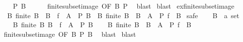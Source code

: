 \begin{isabellebody}
\ \ \isamarkupfalse%
\ {\isachardoublequoteopen}P\ B{\isachardoublequoteclose}\isanewline
\ \ \ \ \isamarkupfalse%
\ finite{\isacharunderscore}{\kern0pt}subset{\isacharunderscore}{\kern0pt}image\ {\isacharbrackleft}{\kern0pt}OF\ B{\isacharbrackright}{\kern0pt}\ P\ \isamarkupfalse%
\ blast\isanewline
{}\isamarkupfalse%
\ blast%
\endisatagproof
{\isafoldproof}%
%
\isadelimproof
\isanewline
%
\endisadelimproof
\isanewline
{}\isamarkupfalse%
\ ex{\isacharunderscore}{\kern0pt}finite{\isacharunderscore}{\kern0pt}subset{\isacharunderscore}{\kern0pt}image{\isacharcolon}{\kern0pt}\isanewline
\ \ {\isachardoublequoteopen}{\isacharparenleft}{\kern0pt}{\isasymexists}B{\isachardot}{\kern0pt}\ finite\ B\ {\isasymand}\ B\ {\isasymsubseteq}\ f\ {\isacharbackquote}{\kern0pt}\ A\ {\isasymand}\ P\ B{\isacharparenright}{\kern0pt}\ {\isasymlongleftrightarrow}\ {\isacharparenleft}{\kern0pt}{\isasymexists}B{\isachardot}{\kern0pt}\ finite\ B\ {\isasymand}\ B\ {\isasymsubseteq}\ A\ {\isasymand}\ P\ {\isacharparenleft}{\kern0pt}f\ {\isacharbackquote}{\kern0pt}\ B{\isacharparenright}{\kern0pt}{\isacharparenright}{\kern0pt}{\isachardoublequoteclose}\isanewline
%
\isadelimproof
%
\endisadelimproof
%
\isatagproof
{}\isamarkupfalse%
\ safe\isanewline
\ \ \isamarkupfalse%
\ B\ {\isacharcolon}{\kern0pt}{\isacharcolon}{\kern0pt}\ {\isachardoublequoteopen}{\isacharprime}{\kern0pt}a\ set{\isachardoublequoteclose}\isanewline
\ \ \isamarkupfalse%
\ B{\isacharcolon}{\kern0pt}\ {\isachardoublequoteopen}finite\ B{\isachardoublequoteclose}\ {\isachardoublequoteopen}B\ {\isasymsubseteq}\ f\ {\isacharbackquote}{\kern0pt}\ A{\isachardoublequoteclose}\ \ {\isachardoublequoteopen}P\ B{\isachardoublequoteclose}\isanewline
\ \ \isamarkupfalse%
\ {\isachardoublequoteopen}{\isasymexists}B{\isachardot}{\kern0pt}\ finite\ B\ {\isasymand}\ B\ {\isasymsubseteq}\ A\ {\isasymand}\ P\ {\isacharparenleft}{\kern0pt}f\ {\isacharbackquote}{\kern0pt}\ B{\isacharparenright}{\kern0pt}{\isachardoublequoteclose}\isanewline
\ \ \ \ \isamarkupfalse%
\ finite{\isacharunderscore}{\kern0pt}subset{\isacharunderscore}{\kern0pt}image\ {\isacharbrackleft}{\kern0pt}OF\ B{\isacharbrackright}{\kern0pt}\ {\isacartoucheopen}P\ B{\isacartoucheclose}\ \isamarkupfalse%
\ blast\isanewline
{}\isamarkupfalse%
\ blast%
\endisatagproof
{\isafoldproof}%
%
\isadelimproof
\isanewline
%
\endisadelimproof
\isanewline
{}\isamarkupfalse%

\end{isabellebody}
